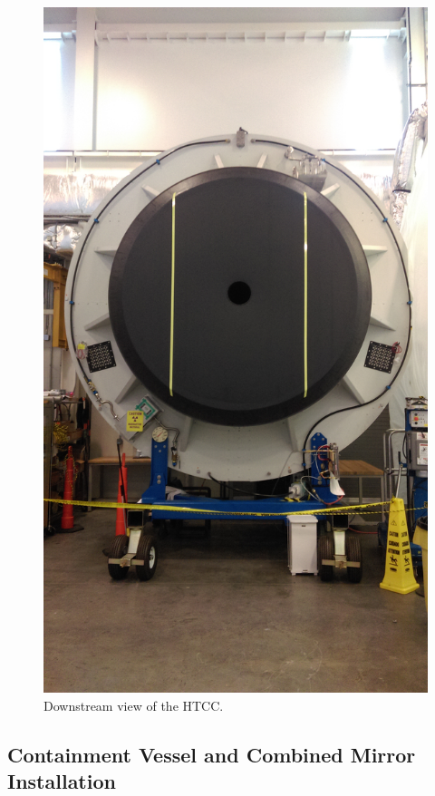 \begin{figure}[ht]
    \centering
    \includegraphics[width=1.0\linewidth,trim={0 25cm 0 500},clip]{images/Exit_Win.jpg}
    \caption{Downstream view of the HTCC.}
    \label{fig:Exit_Win}
\end{figure}

\subsection{Containment Vessel and Combined Mirror Installation}

